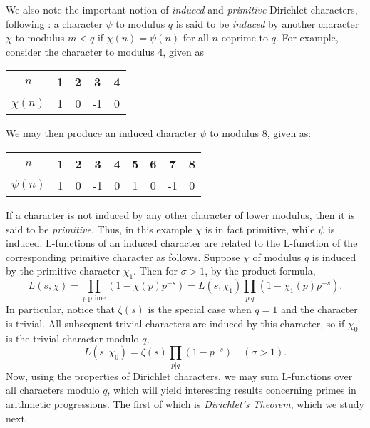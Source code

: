 We also note the important notion of \textit{induced} and \textit{primitive} Dirichlet characters, following \cite{heath-brown_2005}: a character $\psi$ to modulus $q$ is said to be \textit{induced} by another character $\chi$ to modulus $m < q$ if $\chi(n) = \psi(n)$ for all $n$ coprime to $q$. For example, consider the character to modulus 4, given as
\begin{center}
    \begin{tabular}{c|c c c c}
        $n$ &  1 & 2 & 3 & 4\\
        \hline
        $\chi(n)$ & 1 & 0 & -1 & 0
    \end{tabular}
\end{center}
We may then produce an induced character $\psi$ to modulus 8, given as:
\begin{center}
    \begin{tabular}{c|c c c c c c c c}
        $n$ & 1 & 2 & 3 & 4 & 5 & 6 & 7 & 8\\
        \hline
        $\psi(n)$ & 1 & 0 & -1 & 0 & 1 & 0 & -1 & 0
    \end{tabular}
\end{center}
If a character is not induced by any other character of lower modulus, then it is said to be \textit{primitive}. Thus, in this example $\chi$ is in fact primitive, while $\psi$ is induced. L-functions of an induced character are related to the L-function of the corresponding primitive character as follows. Suppose $\chi$ of modulus $q$ is induced by the primitive character $\chi_1$. Then for $\sigma > 1$, by the product formula,
\begin{equation}
\label{InducedCharacterRelation}
    L(s, \chi) = \prod_{p \ \textrm{prime}}(1 - \chi(p)p^{-s}) = L(s, \chi_1) \prod_{p \rvert q}(1 - \chi_{1}(p)p^{-s}).
\end{equation}
In particular, notice that $\zeta(s)$ is the special case when $q = 1$ and the character is trivial. All subsequent trivial characters are induced by this character, so if $\chi_0$ is the trivial character modulo $q$,
\begin{equation}
\label{LZetaRelation}
    L(s, \chi_{0}) = \zeta(s) \prod_{p \rvert q}(1 - p^{-s}) \quad (\sigma > 1). 
\end{equation}
Now, using the properties of Dirichlet characters, we may sum L-functions over all characters modulo $q$, which will yield interesting results concerning primes in arithmetic progressions. The first of which is \textit{Dirichlet's Theorem}, which we study next.